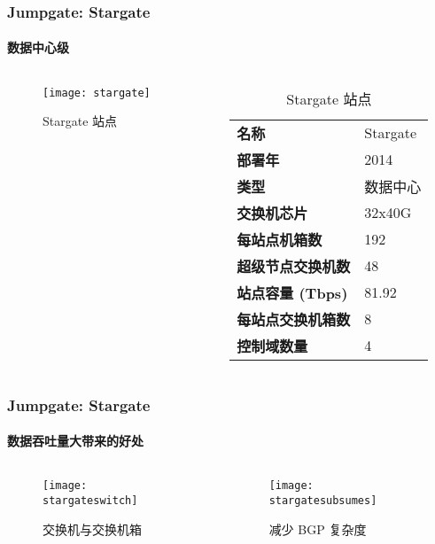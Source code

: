     \begin{frame}
        \frametitle{Jumpgate: Stargate}
        \framesubtitle{数据中心级}
        \begin{columns}
            \begin{column}{0.4\textwidth}
                \begin{figure}
                    \texttt{[image: stargate]}
                    \caption{Stargate 站点}
                \end{figure}
            \end{column}
            \begin{column}{0.6\textwidth}
                \begin{table}
                    \begin{tabular}{>{\bfseries}ll}
                        \toprule
                        名称 & Stargate \\
                        部署年 & 2014 \\
                        类型 & 数据中心 \\
                        交换机芯片 & 32x40G \\
                        每站点机箱数 & 192 \\
                        超级节点交换机数 & 48 \\
                        站点容量 (Tbps) & 81.92\\
                        每站点交换机箱数 & 8 \\
                        控制域数量 & 4 \\
                        \bottomrule
                    \end{tabular}
                    \caption{Stargate 站点}\label{tab:stargate}
                \end{table}
            \end{column}
        \end{columns}
    \end{frame}

    \begin{frame}
        \frametitle{Jumpgate: Stargate}
        \framesubtitle{数据吞吐量大带来的好处}

        \begin{columns}
            \begin{column}{0.2\textwidth}
                \begin{figure}
                    \texttt{[image: stargateswitch]}
                    \caption{交换机与交换机箱}
                \end{figure}
            \end{column}
            \begin{column}{0.6\textwidth}
                \begin{figure}
                    \texttt{[image: stargatesubsumes]}
                    \caption{减少 BGP 复杂度}
                \end{figure}
            \end{column}
        \end{columns}
    \end{frame}

    \makebottom
